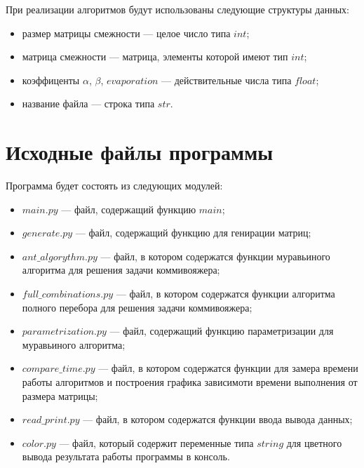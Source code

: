 При реализации алгоритмов будут использованы следующие структуры данных:

\begin{itemize}[label=---]
	\item размер матрицы смежности --- целое число типа $int$;
	\item матрица смежности --- матрица, элементы которой имеют тип $int$;
	\item коэффиценты $\alpha$, $\beta$, $evaporation$ --- действительные числа типа $float$;
	\item название файла --- строка типа $str$.
\end{itemize}

\clearpage

\section{Исходные файлы программы}

Программа будет состоять из следующих модулей:

\begin{itemize}[label=---]
	\item $main.py$ --- файл, содержащий функцию $main$;
	\item $generate.py$ --- файл, содержащий функцию для генирации матриц;
    \item $ant\_algorythm.py$ --- файл, в котором содержатся функции муравьиного алгоритма для решения задачи коммивояжера;
    \item $full\_combinations.py$ --- файл, в котором содержатся функции алгоритма полного перебора для решения задачи коммивояжера;
    \item $parametrization.py$ --- файл, содержащий функцию параметризации для муравьиного алгоритма;
    \item $compare\_time.py$ --- файл, в котором содержатся функции для замера времени работы алгоритмов и построения графика зависимоти времени выполнения от размера матрицы;
    \item $read\_print.py$ --- файл, в котором содержатся функции ввода вывода данных;
    \item $color.py$ --- файл, который содержит переменные типа $string$ для цветного вывода результата работы программы в консоль.
\end{itemize}

\clearpage